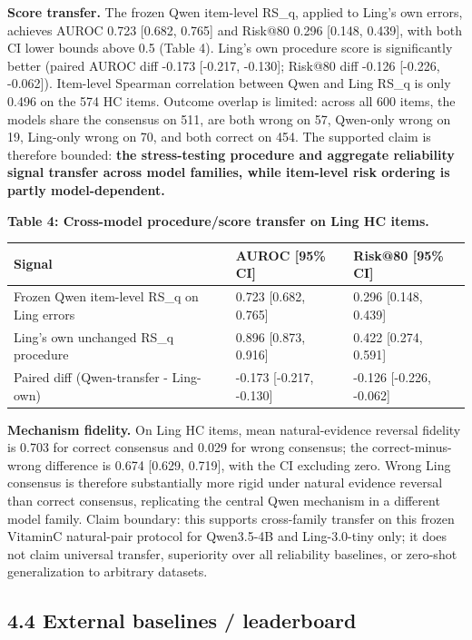 \documentclass[11pt]{article}
\begin{document}
\textbf{Score transfer.} The frozen Qwen item-level RS\_q, applied to Ling's own errors, achieves AUROC 0.723 [0.682, 0.765] and Risk@80 0.296 [0.148, 0.439], with both CI lower bounds above 0.5 (Table 4). Ling's own procedure score is significantly better (paired AUROC diff -0.173 [-0.217, -0.130]; Risk@80 diff -0.126 [-0.226, -0.062]). Item-level Spearman correlation between Qwen and Ling RS\_q is only 0.496 on the 574 HC items. Outcome overlap is limited: across all 600 items, the models share the consensus on 511, are both wrong on 57, Qwen-only wrong on 19, Ling-only wrong on 70, and both correct on 454. The supported claim is therefore bounded: \textbf{the stress-testing procedure and aggregate reliability signal transfer across model families, while item-level risk ordering is partly model-dependent.}

\textbf{Table 4: Cross-model procedure/score transfer on Ling HC items.}

\begin{table}[t]
\centering
\small
\begin{tabular}{lll}
\toprule
Signal & AUROC [95\% CI] & Risk@80 [95\% CI] \\
\midrule
Frozen Qwen item-level RS\_q on Ling errors & 0.723 [0.682, 0.765] & 0.296 [0.148, 0.439] \\
Ling's own unchanged RS\_q procedure & 0.896 [0.873, 0.916] & 0.422 [0.274, 0.591] \\
Paired diff (Qwen-transfer - Ling-own) & -0.173 [-0.217, -0.130] & -0.126 [-0.226, -0.062] \\
\bottomrule
\end{tabular}
\end{table}


\textbf{Mechanism fidelity.} On Ling HC items, mean natural-evidence reversal fidelity is 0.703 for correct consensus and 0.029 for wrong consensus; the correct-minus-wrong difference is 0.674 [0.629, 0.719], with the CI excluding zero. Wrong Ling consensus is therefore substantially more rigid under natural evidence reversal than correct consensus, replicating the central Qwen mechanism in a different model family. Claim boundary: this supports cross-family transfer on this frozen VitaminC natural-pair protocol for Qwen3.5-4B and Ling-3.0-tiny only; it does not claim universal transfer, superiority over all reliability baselines, or zero-shot generalization to arbitrary datasets.

\subsection{4.4 External baselines / leaderboard}
\end{document}

